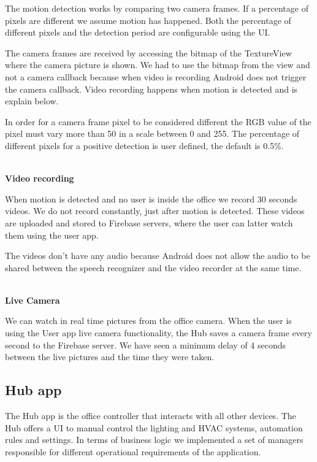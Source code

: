 The motion detection works by comparing two camera frames. If a percentage of pixels are different we assume motion has happened. Both the percentage of different pixels and the detection period are configurable using the \ac{UI}.

The camera frames are received by accessing the bitmap of the TextureView where the camera picture is shown. We had to use the bitmap from the view and not a camera callback because when video is recording Android does not trigger the camera callback. Video recording happens when motion is detected and is explain below.

In order for a camera frame pixel to be considered different the RGB value of the pixel must vary more than 50 in a scale between 0 and 255. The percentage of different pixels for a positive detection is user defined, the default is 0.5\%.


\mbox{}\\
\textbf{Video recording}

When motion is detected and no user is inside the office we record 30 seconds videos. We do not record constantly, just after motion is detected. These videos are uploaded and stored to Firebase servers, where the user can latter watch them using the user app.

The videos don't have any audio because Android does not allow the audio to be shared between the speech recognizer and the video recorder at the same time.


\mbox{}\\
\textbf{Live Camera}

We can watch in real time pictures from the office camera. When the user is using the User app live camera functionality, the Hub saves a camera frame every second to the Firebase server. We have seen a minimum delay of 4 seconds between the live pictures and the time they were taken.


\subsection{Hub app}



The Hub app is the office controller that interacts with all other devices. The Hub offers a \ac{UI} to manual control the lighting and \ac{HVAC} systems, automation rules and settings. In terms of business logic we implemented a set of managers responsible for different operational requirements of the application.


